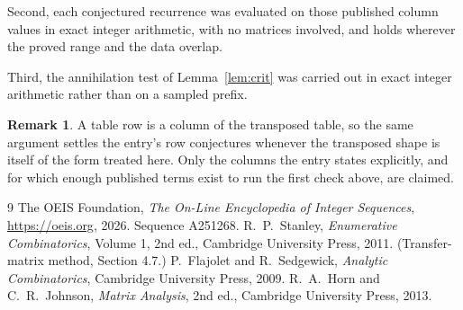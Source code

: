 \documentclass[11pt,a4paper]{article}
\theoremstyle{plain}
\theoremstyle{definition}
\newtheorem{remark}[theorem]{Remark}
\begin{document}
Second, each conjectured recurrence was evaluated on those published column values in exact
integer arithmetic, with no matrices involved, and holds wherever the proved range and the
data overlap.

Third, the annihilation test of Lemma~\ref{lem:crit} was carried out in exact integer
arithmetic rather than on a sampled prefix.

\begin{remark}
A table row is a column of the transposed table, so the same argument settles the entry's row
conjectures whenever the transposed shape is itself of the form treated here. Only the columns
the entry states explicitly, and for which enough published terms exist to run the first check
above, are claimed.
\end{remark}

\begin{thebibliography}{9}
 The OEIS Foundation, \emph{The On-Line Encyclopedia of Integer
Sequences}, \url{https://oeis.org}, 2026. Sequence A251268.
 R.~P.~Stanley, \emph{Enumerative Combinatorics}, Volume 1, 2nd ed.,
Cambridge University Press, 2011. (Transfer-matrix method, Section 4.7.)
 P.~Flajolet and R.~Sedgewick, \emph{Analytic Combinatorics}, Cambridge
University Press, 2009.
 R.~A.~Horn and C.~R.~Johnson, \emph{Matrix Analysis}, 2nd ed., Cambridge
University Press, 2013.
\end{thebibliography}
\end{document}
